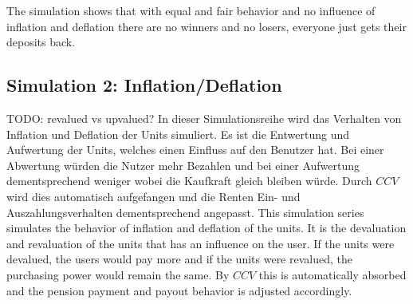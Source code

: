 \begin{table}[hbt!]
\centering
{}
\end{table}

\begin{table}[hbt!]
\centering
{}
\end{table}

The simulation shows that with equal and fair behavior and no influence of inflation and deflation there are no winners and no losers, everyone just gets their deposits back.

\subsection{Simulation 2: Inflation/Deflation}

TODO: revalued vs upvalued?
In dieser Simulationsreihe wird das Verhalten von Inflation und Deflation der Units simuliert. Es ist die Entwertung und Aufwertung der Units, welches einen Einfluss auf den Benutzer hat. Bei einer Abwertung würden die Nutzer mehr Bezahlen und bei einer Aufwertung dementsprechend weniger wobei die Kaufkraft gleich bleiben würde. Durch $CCV$ wird dies automatisch aufgefangen und die Renten Ein- und Auszahlungsverhalten dementsprechend angepasst. 
This simulation series simulates the behavior of inflation and deflation of the units. It is the devaluation and revaluation of the units that has an influence on the user. If the units were devalued, the users would pay more and if the units were revalued, the purchasing power would remain the same. By $CCV$ this is automatically absorbed and the pension payment and payout behavior is adjusted accordingly. 

